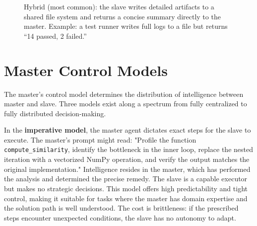 \begin{figure}[t]
\centering
{}
\caption{Hybrid (most common): the slave writes detailed artifacts to a shared file system and returns a concise summary directly to the master. Example: a test runner writes full logs to a file but returns ``14 passed, 2 failed.''}
\label{fig:comm_hybrid}
\end{figure}

\section{Master Control Models}\label{sec:control}

The master's control model determines the distribution of intelligence between master and slave. Three models exist along a spectrum from fully centralized to fully distributed decision-making.

In the \textbf{imperative model}, the master agent dictates exact steps for the slave to execute. The master's prompt might read: "Profile the function \texttt{compute\_similarity}, identify the bottleneck in the inner loop, replace the nested iteration with a vectorized NumPy operation, and verify the output matches the original implementation." Intelligence resides in the master, which has performed the analysis and determined the precise remedy. The slave is a capable executor but makes no strategic decisions. This model offers high predictability and tight control, making it suitable for tasks where the master has domain expertise and the solution path is well understood. The cost is brittleness: if the prescribed steps encounter unexpected conditions, the slave has no autonomy to adapt.

